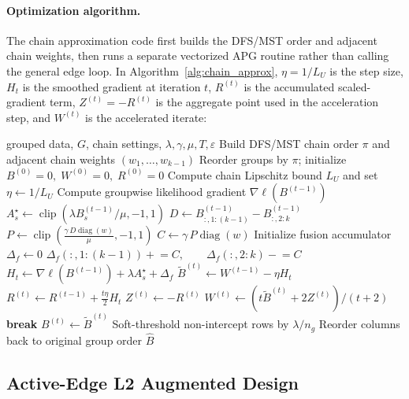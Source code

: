 \documentclass[twoside,11pt]{article}
\newcommand{\norm}[1]{\left\lVert #1 \right\rVert}
\DeclareMathOperator{\clip}{clip}
\begin{document}
\paragraph{Optimization algorithm.}
The chain approximation code first builds the DFS/MST order and adjacent chain
weights, then runs a separate vectorized APG routine rather than calling the
general edge loop. In Algorithm~\ref{alg:chain_approx},
$\eta=1/L_U$ is the step size, $H_t$ is the smoothed gradient at iteration
$t$, $R^{(t)}$ is the accumulated scaled-gradient term, $Z^{(t)}=-R^{(t)}$ is
the aggregate point used in the acceleration step, and $W^{(t)}$ is the
accelerated iterate:
\begin{algorithm}[t]
\caption{Chain Approximation APG (\texttt{chain\_approx})}
\label{alg:chain_approx}
\begin{algorithmic}[1]
\Require grouped data, $G$, chain settings, $\lambda,\gamma,\mu,T,\varepsilon$
\State Build DFS/MST chain order $\pi$ and adjacent chain weights $(w_1,\dots,w_{k-1})$
\State Reorder groups by $\pi$; initialize $B^{(0)}=0,\;W^{(0)}=0,\;R^{(0)}=0$
\State Compute chain Lipschitz bound $L_U$ and set $\eta\gets 1/L_U$
  \State Compute groupwise likelihood gradient $\nabla \ell(B^{(t-1)})$
  \State $A_s^\star\gets\clip(\lambda B_s^{(t-1)}/\mu,-1,1)$
  \State $D\gets B^{(t-1)}_{:,1:(k-1)}-B^{(t-1)}_{:,2:k}$
  \State $P\gets \clip\!\left(\frac{\gamma\,D\operatorname{diag}(w)}{\mu},-1,1\right)$
  \State $C\gets \gamma\,P\operatorname{diag}(w)$
  \State Initialize fusion accumulator $\Delta_f\gets 0$
  \State $\Delta_f(:,1:(k-1)) \mathrel{+}= C,\qquad
  \Delta_f(:,2:k) \mathrel{-}= C$
  \State $H_t\gets \nabla \ell(B^{(t-1)})+\lambda A_s^\star+\Delta_f$
  \State $\tilde B^{(t)}\gets W^{(t-1)}-\eta H_t$
  \State $R^{(t)}\gets R^{(t-1)}+\frac{t\eta}{2}H_t$
  \State $Z^{(t)}\gets -R^{(t)}$
  \State $W^{(t)}\gets \left(t\tilde B^{(t)}+2Z^{(t)}\right)/(t+2)$
  \If{$\norm{\tilde B^{(t)}-B^{(t-1)}}_1<\varepsilon p$}
    \State \textbf{break}
  \EndIf
  \State $B^{(t)}\gets \tilde B^{(t)}$
\EndFor
\State Soft-threshold non-intercept rows by $\lambda/n_g$
\State Reorder columns back to original group order
\State \Return $\hat B$
\end{algorithmic}
\end{algorithm}

\subsection{Active-Edge L2 Augmented Design}
\end{document}
